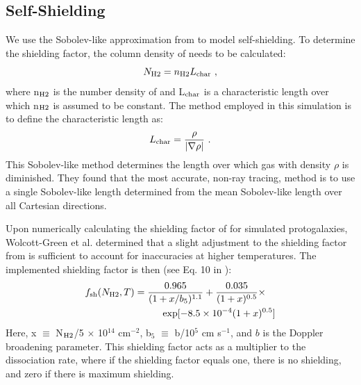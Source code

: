 \documentclass[a4paper,fleqn,usenatbib]{mnras}
\begin{document}
\subsection{\hh{} Self-Shielding}
We use the Sobolev-like approximation from \citet{Wolcott11} to model \hh{} self-shielding. To determine the \hh{} shielding factor, the column density of \hh{} needs to be calculated:
\begin{equation} \label{Nh2}
	N_{\rm H2} = n_{\rm H2}L_{\rm char} \ ,
\end{equation}
where n$_{\rm H2}$ is the number density of \hh{} and L$_{\rm char}$ is a characteristic length over which n$_{\rm H2}$ is assumed to be constant. The method employed in this simulation is to define the characteristic length as:
\begin{equation} \label{Lchar}
	L_{\rm char} = \frac{\rho}{|\nabla \rho|} \ . 
\end{equation}
This Sobolev-like method determines the length over which gas with density $\rho$ is diminished. They found that the most accurate, non-ray tracing, method is to use a single Sobolev-like length determined from the mean Sobolev-like length over all Cartesian directions. 

Upon numerically calculating the shielding factor of \hh{} for simulated protogalaxies, Wolcott-Green et al. determined that a slight adjustment to the shielding factor from \citet{Draine96} is sufficient to account for inaccuracies at higher temperatures. The implemented shielding factor is then (see Eq. 10 in \citet{Wolcott11}):
\begin{equation} \label{shield}
	\begin{multlined}
	f_{\rm sh}(N_{\rm H2}, T) = \frac{0.965}{(1+x/b_{5})^{1.1}} + \frac{0.035}{(1+x)^{0.5}}  \times \\ \exp [-8.5 \times 10^{-4} (1+x)^{0.5}]
	\end{multlined}
\end{equation}
Here, x $\equiv$ N$_{\rm H2}$/5 $\times$ 10$^{14}$ cm$^{-2}$, b$_{5}$ $\equiv$ b/10$^{5}$ cm s$^{-1}$, and $b$ is the Doppler broadening parameter. This shielding factor acts as a multiplier to the \hh{} dissociation rate, where if the shielding factor equals one, there is no shielding, and zero if there is maximum shielding.

\end{document}
